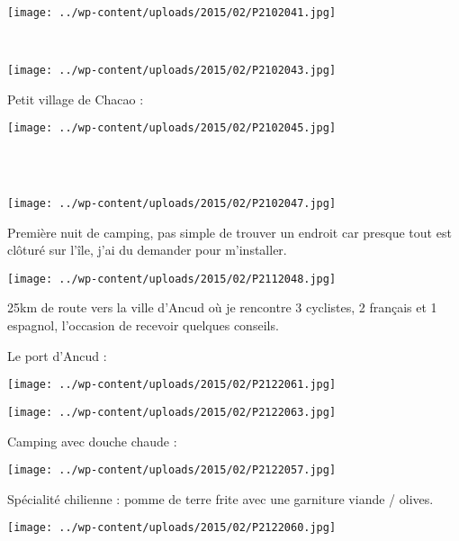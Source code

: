 \pagebreak
~
\begin{center} \texttt{[image: ../wp-content/uploads/2015/02/P2102041.jpg]} \end{center}
~
\begin{center} \texttt{[image: ../wp-content/uploads/2015/02/P2102043.jpg]} \end{center}
\vspace{-\topsep}

\pagebreak
 Petit village de Chacao :\\
\begin{center} \texttt{[image: ../wp-content/uploads/2015/02/P2102045.jpg]} \end{center}
~\\

~
\begin{center} \texttt{[image: ../wp-content/uploads/2015/02/P2102047.jpg]} \end{center}
\vspace{-\topsep}

\pagebreak
 Première nuit de camping, pas simple de trouver un endroit car presque tout est clôturé sur l'île, j'ai du demander pour m'installer. 
\begin{center} \texttt{[image: ../wp-content/uploads/2015/02/P2112048.jpg]} \end{center}

 25km de route vers la ville d'Ancud où je rencontre 3 cyclistes, 2 français et 1 espagnol, l'occasion de recevoir quelques conseils.

 Le port d'Ancud :
\begin{center} \texttt{[image: ../wp-content/uploads/2015/02/P2122061.jpg]} \end{center}
\begin{center} \texttt{[image: ../wp-content/uploads/2015/02/P2122063.jpg]} \end{center}

 Camping avec douche chaude :
\begin{center} \texttt{[image: ../wp-content/uploads/2015/02/P2122057.jpg]} \end{center}
\vspace{-\topsep}

\pagebreak
Spécialité chilienne : pomme de terre frite avec une garniture viande / olives.
\begin{center} \texttt{[image: ../wp-content/uploads/2015/02/P2122060.jpg]} \end{center}